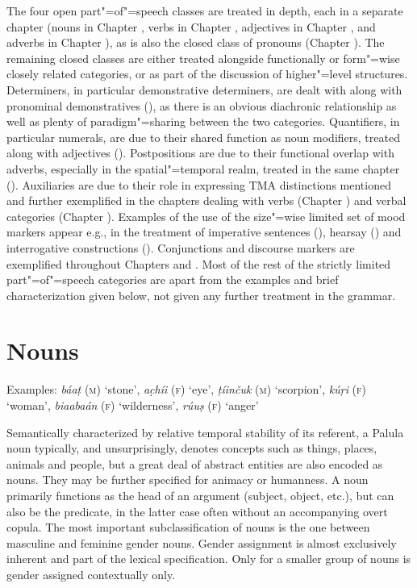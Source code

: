 The four open part"=of"=speech classes are treated in depth, each in a separate chapter (nouns in Chapter , verbs in Chapter , adjectives in Chapter , and adverbs in Chapter ), as is also the closed class of pronouns (Chapter ). The remaining closed classes are either treated alongside functionally or form"=wise closely related categories, or as part of the discussion of higher"=level structures. Determiners, in particular demonstrative determiners, are dealt with along with pronominal demonstratives (), as there is an obvious diachronic relationship as well as plenty of paradigm"=sharing between the two categories. Quantifiers, in particular numerals, are due to their shared function as noun modifiers, treated along with adjectives (). Postpositions are due to their functional overlap with adverbs, especially in the spatial"=temporal realm, treated in the same chapter (). Auxiliaries are due to their role in expressing TMA distinctions mentioned and further exemplified in the chapters dealing with verbs (Chapter ) and verbal categories (Chapter ). Examples of the use of the size"=wise limited set of mood markers appear e.g., in the treatment of imperative sentences (), hearsay () and interrogative constructions (). Conjunctions and discourse markers are exemplified throughout Chapters  and . Most of the rest of the strictly limited part"=of"=speech categories are apart from the examples and brief characterization given below, not given any further treatment in the grammar.


\section{Nouns}
\label{sec:3b-2}

Examples: \textit{báaṭ} (\textsc{m}) `stone', \textit{ac̣híi} (\textsc{f}) `eye', \textit{ṭíinčuk} (\textsc{m}) `scorpion', \textit{kúṛi} (\textsc{f}) `woman',  \textit{biaabaán} (\textsc{f}) `wilderness', \textit{rúuṣ} (\textsc{f}) `anger'


Semantically characterized by relative temporal stability of its referent, a Palula noun typically, and unsurprisingly, denotes concepts such as things, places, animals and people, but a great deal of abstract entities are also encoded as nouns. They may be further specified for animacy or humanness. A noun primarily functions as the head of an argument (subject, object, etc.), but can also be the predicate, in the latter case often without an accompanying overt copula. The most important subclassification of nouns is the one between masculine and feminine gender nouns. Gender assignment is almost exclusively inherent and part of the lexical specification. Only for a smaller group of nouns is gender assigned contextually only.


